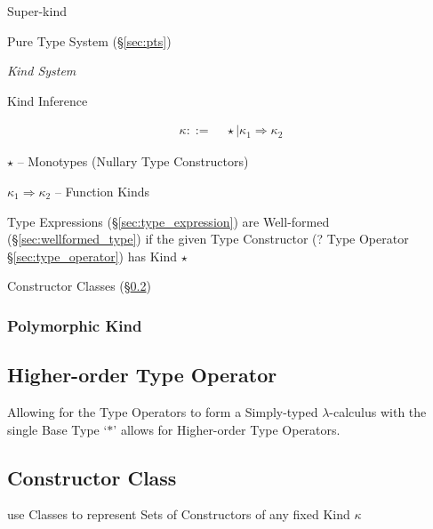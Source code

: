 Super-kind

Pure Type System (\S\ref{sec:pts})


\cite{jones95}


\emph{Kind System}

Kind Inference

\begin{align*}
  \kappa ::= &\; \star \mid \kappa_1 \Rightarrow \kappa_2
\end{align*}

$\star$ -- Monotypes (Nullary Type Constructors)

$\kappa_1 \Rightarrow \kappa_2$ -- Function Kinds

Type Expressions (\S\ref{sec:type_expression}) are Well-formed
(\S\ref{sec:wellformed_type}) if the given Type Constructor (? Type
Operator \S\ref{sec:type_operator}) has Kind $\star$

Constructor Classes (\S\ref{sec:constructor_class})



\subsubsection{Polymorphic Kind}\label{sec:polymorphic_kind}



\subsection{Higher-order Type Operator}
\label{sec:higherorder_typeoperator}

Allowing for the Type Operators to form a Simply-typed
$\lambda$-calculus with the single Base Type `$*$' allows for
Higher-order Type Operators.



\subsection{Constructor Class}\label{sec:constructor_class}

use Classes to represent Sets of Constructors of any fixed Kind
$\kappa$

